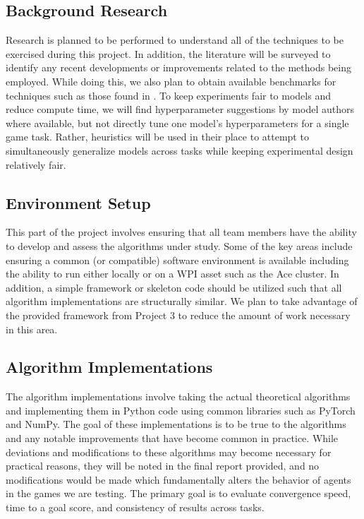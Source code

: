 \documentclass[conference]{IEEEtran}
\begin{document}
\subsection{Background Research}
Research is planned to be performed to understand all of the techniques to be exercised during this project.
In addition, the literature will be surveyed to identify any recent developments or improvements related to the methods being employed.
While doing this, we also plan to obtain available benchmarks for techniques such as those found in \cite{DQNOriginalPaper, NatureDeepLearning, bhonker2017playing}.
To keep experiments fair to models and reduce compute time, we will find hyperparameter suggestions by model authors where available, but not directly tune one model's hyperparameters for a single game task. Rather, heuristics will be used in their place to attempt to simultaneously generalize models across tasks while keeping experimental design relatively fair.

\subsection{Environment Setup}
This part of the project involves ensuring that all team members have the ability to develop and assess the algorithms under study.
Some of the key areas include ensuring a common (or compatible) software environment is available including the ability to run \cite{nichol2018retro} either locally or on a WPI asset such as the Ace cluster.
In addition, a simple framework or skeleton code should be utilized such that all algorithm implementations are structurally similar.
We plan to take advantage of the provided framework from Project 3 to reduce the amount of work necessary in this area.

\subsection{Algorithm Implementations}
The algorithm implementations involve taking the actual theoretical algorithms and implementing them in Python code using common libraries such as PyTorch and NumPy.
The goal of these implementations is to be true to the algorithms and any notable improvements that have become common in practice.
While deviations and modifications to these algorithms may become necessary for practical reasons, they will be noted in the final report provided, and no modifications would be made which fundamentally alters the behavior of agents in the games we are testing. The primary goal is to evaluate convergence speed, time to a goal score, and consistency of results across tasks.
\end{document}
